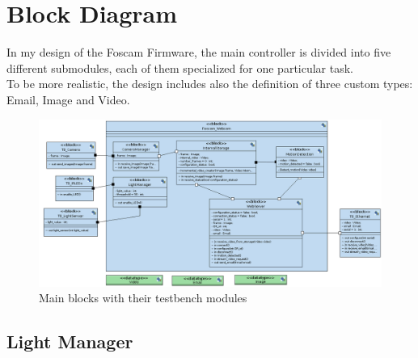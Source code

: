 \documentclass{article}
\begin{document}
\section{Block Diagram}
In my design of the Foscam Firmware, the main controller is divided into five
different submodules, each of them specialized for one particular task.
\\
To be more realistic, the design includes also the definition of three custom
types: Email, Image and Video.
\begin{figure}[!h]
  \centering
  \includegraphics[width=\textwidth]{./Foscam00.png}
  \caption{Main blocks with their testbench modules}
\end{figure}

\subsection{Light Manager}
\label{sec:Light Manager}
\end{document}
